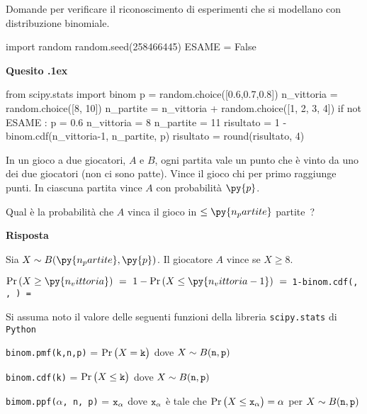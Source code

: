 \documentclass[11pt,twoside,a4paper]{article}
\newcounter{quesito}
\newenvironment{question}{\bigskip\addtocounter{quesito}{1}\bigskip\bigskip\par\textbf{Quesito \thequesito.\kern1ex}}{\vspace{\parskip}}
\newenvironment{answer}{\par\textbf{Risposta\quad}}{\vspace{\parskip}}
\begin{document}
\colorbox{blue!10}{\begin{minipage}{\textwidth}
Domande  per verificare il riconoscimento di esperimenti che si modellano con distribuzione binomiale.
\end{minipage}}

\bigskip\bigskip


\begin{pycode}
import random
random.seed(258466445)
ESAME = False
\end{pycode}


\begin{question}
\def\Pr{{\rm Pr\,}}
\def\Ex{{\rm E\,}}
\def\Var{{\rm Var\,}}
\begin{pycode}
from scipy.stats import binom
p = random.choice([0.6,0.7,0.8])
n_vittoria = random.choice([8, 10])
n_partite = n_vittoria + random.choice([1, 2, 3, 4])
if not ESAME :
   p = 0.6
   n_vittoria = 8
   n_partite = 11
risultato = 1 - binom.cdf(n_vittoria-1, n_partite, p)
risultato = round(risultato, 4)
\end{pycode}
In un gioco a due giocatori, $A$ e $B$, ogni partita vale un punto che è vinto da uno dei due giocatori (non ci sono patte). Vince il gioco chi per primo raggiunge  punti. In ciascuna partita vince $A$ con probabilità $\py{p}$.

Qual è la probabilità che $A$ vinca il gioco in $\le\py{n_partite}$ partite~?
\begin{answer}

Sia $X\sim B(\py{n_partite},\py{p})$. Il giocatore $A$ vince se $X\ge 8$. 

$\displaystyle\Pr(X\ge\py{n_vittoria})\ =\ 1-\Pr( X\le\py{n_vittoria-1} )\ =\ ${\tt\color{blue}1-binom.cdf(, , ) = }{\tt{} }
\end{answer}
\end{question}




\vfill
\hrulefill

Si assuma noto il valore delle seguenti funzioni della libreria {\tt scipy.stats\/} di  {\tt Python\/}

{\tt binom.pmf(k,n,p)} = $\Pr\big(X={\tt k}\big)$ dove $X\sim B({\tt n},{\tt p})$ 

{\tt binom.cdf(k)} = $\Pr\big(X\le{\tt k}\big)$ dove  $X\sim B({\tt n},{\tt p})$ 

{\tt bimom.ppf($\alpha$, n, p)} = ${\tt x_\alpha}$ dove ${\tt x_\alpha}$ è tale che $\Pr\big(X\le{\tt x_\alpha}\big)=\alpha$ per $X\sim B({\tt n},{\tt p})$ 
\end{document}
